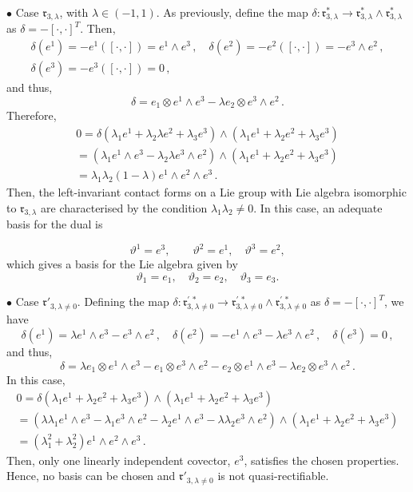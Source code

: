 \documentclass[12pt]{article}
\theoremstyle{plain}
\theoremstyle{definition}
\numberwithin{equation}{section}
\begin{document}
$\bullet$ Case $\mathfrak{r}_{3,\lambda}$, with  $\lambda\in (-1,1)$. As previously, define the map $\delta:\mathfrak{r}_{3,\lambda}^*\rightarrow \mathfrak{r}_{3,\lambda}^*\wedge\mathfrak{r}_{3,\lambda}^*$ as $\delta = -[\cdot,\cdot]^T$. Then,
\begin{gather*}
    \delta(e^1) = -e^1([\cdot,\cdot])=    e^1\wedge e^3\,,\quad
    \delta(e^2) = -e^2([\cdot,\cdot]) = - e^3\wedge e^2\,,\\
    \delta(e^3) = -e^3([\cdot,\cdot]) = 0\,,
\end{gather*}
and thus,
$$
    \delta =  e_1\otimes e^1\wedge e^3 -  \lambda e_2\otimes e^3\wedge e^2\,.
$$
Therefore,
\begin{multline*}
    0 = \delta(\lambda_1e^1 + \lambda_2\lambda e^2 + \lambda_3e^3)\wedge(\lambda_1e^1 + \lambda_2e^2 + \lambda_3e^3)\\= \left(  {\lambda_1}e^1\wedge e^3 - {\lambda_2\lambda} e^3\wedge e^2\right)\wedge(\lambda_1e^1 + \lambda_2e^2 + \lambda_3e^3)\\
    = \lambda_1\lambda_2(1-\lambda)e^1\wedge e^2\wedge e^3\,.
\end{multline*}
Then, the left-invariant contact forms on a Lie group with Lie algebra isomorphic to $\mathfrak{r}_{3,\lambda}$  are characterised by the condition $\lambda_1\lambda_2\neq 0$. 
In this case, an adequate basis for the dual is

$$
\vartheta^1=e^3,\qquad \vartheta^2=e^1,\quad \vartheta^3=e^2,
$$
which gives a basis for the Lie algebra given by
$$
\vartheta_1=e_1,\quad \vartheta_2=e_2,\quad \vartheta_3=e_3.
$$


$\bullet$ Case $\mathfrak{r}'_{3,\lambda\neq 0}$. Defining the map $\delta:\mathfrak{r}_{3,\lambda\neq 0}^{\prime \,*}\rightarrow \mathfrak{r}_{3,\lambda\neq 0}^{\prime \,*}\wedge\mathfrak{r}_{3,\lambda\neq 0}^{\prime \,*}$ as $\delta = -[\cdot,\cdot]^T$, we have
$$
    \delta(e^1) =  \lambda e^1\wedge e^3 -  e^3\wedge e^2\,,\quad
    \delta(e^2) = - e^1\wedge e^3 -  \lambda e^3\wedge e^2\,,\quad
    \delta(e^3) = 0\,,
$$
and thus,
$$
    \delta =  \lambda e_1\otimes e^1\wedge e^3 -  e_1\otimes e^3\wedge e^2 -  e_2\otimes e^1\wedge e^3 -  \lambda e_2\otimes e^3\wedge e^2\,.
$$
In this case,
\begin{multline*}
    0 = \delta(\lambda_1e^1 + \lambda_2e^2 + \lambda_3e^3)\wedge(\lambda_1e^1 + \lambda_2e^2 + \lambda_3e^3)\\
    = \left(  \lambda\lambda_1  e^1\wedge e^3 -  \lambda_1 e^3\wedge e^2 -  \lambda_2 e^1\wedge e^3 -  \lambda\lambda_2 e^3\wedge e^2 \right)\wedge(\lambda_1e^1 + \lambda_2e^2 + \lambda_3e^3)\\
    =  \left( \lambda_1^2 + \lambda_2^2\right) e^1\wedge e^2\wedge e^3\,.
\end{multline*}
Then,  only one linearly independent covector, $e^3$, satisfies the chosen properties. Hence, no basis can be chosen and $\mathfrak{r}'_{3,\lambda\neq 0}$ is not quasi-rectifiable.
\end{document}
